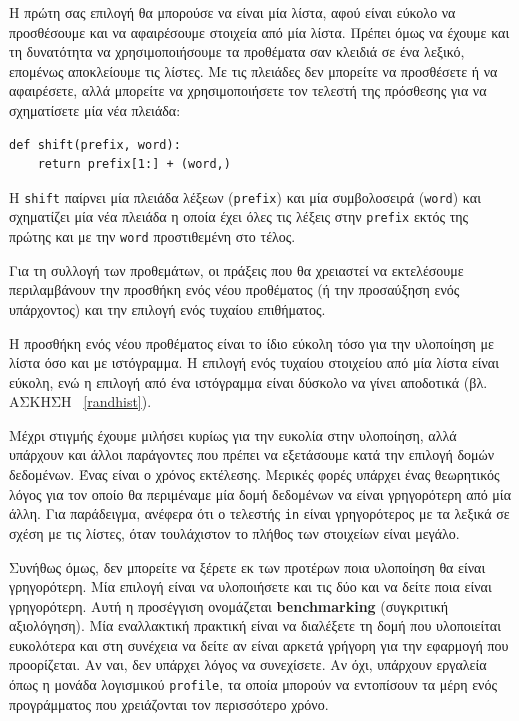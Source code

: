 \documentclass[10pt]{book}
\begin{document}
Η πρώτη σας επιλογή θα μπορούσε να είναι μία λίστα, αφού είναι εύκολο να προσθέσουμε και να αφαιρέσουμε στοιχεία από μία λίστα. Πρέπει όμως να έχουμε και τη δυνατότητα να χρησιμοποιήσουμε τα προθέματα σαν κλειδιά σε ένα λεξικό, επομένως αποκλείουμε τις λίστες. Με τις πλειάδες δεν μπορείτε να προσθέσετε ή να αφαιρέσετε, αλλά μπορείτε να χρησιμοποιήσετε τον τελεστή της πρόσθεσης για να σχηματίσετε μία νέα πλειάδα:

\begin{verbatim}
def shift(prefix, word):
    return prefix[1:] + (word,)
\end{verbatim}
%
Η {\tt shift} παίρνει μία πλειάδα λέξεων ({\tt prefix}) και μία συμβολοσειρά ({\tt word}) και σχηματίζει μία νέα πλειάδα η οποία έχει όλες τις λέξεις στην {\tt prefix} εκτός της πρώτης και με την {\tt word} προστιθεμένη στο τέλος.

Για τη συλλογή των προθεμάτων, οι πράξεις που θα χρειαστεί να εκτελέσουμε περιλαμβάνουν την προσθήκη ενός νέου προθέματος (ή την προσαύξηση ενός υπάρχοντος) και την επιλογή ενός τυχαίου επιθήματος.

Η προσθήκη ενός νέου προθέματος είναι το ίδιο εύκολη τόσο για την υλοποίηση με λίστα όσο και με ιστόγραμμα. 
Η επιλογή ενός τυχαίου στοιχείου από μία λίστα είναι εύκολη, ενώ η επιλογή από ένα ιστόγραμμα είναι δύσκολο να 
γίνει αποδοτικά (βλ. ΑΣΚΗΣΗ ~\ref{randhist}).

Μέχρι στιγμής έχουμε μιλήσει κυρίως για την ευκολία στην υλοποίηση, αλλά υπάρχουν και άλλοι παράγοντες που πρέπει 
να εξετάσουμε κατά την επιλογή δομών δεδομένων. Ένας είναι ο χρόνος εκτέλεσης. Μερικές φορές υπάρχει ένας θεωρητικός λόγος για τον οποίο θα περιμέναμε μία δομή δεδομένων να είναι γρηγορότερη από μία άλλη. Για παράδειγμα, ανέφερα ότι ο τελεστής {\tt in} είναι γρηγορότερος με τα λεξικά σε σχέση με τις λίστες, όταν τουλάχιστον το πλήθος των στοιχείων είναι μεγάλο.

Συνήθως όμως, δεν μπορείτε να ξέρετε εκ των προτέρων ποια υλοποίηση θα είναι γρηγορότερη. Μία επιλογή είναι να υλοποιήσετε και τις δύο και να δείτε ποια είναι γρηγορότερη. Αυτή η προσέγγιση ονομάζεται {\bf benchmarking} (συγκριτική αξιολόγηση). Μία εναλλακτική πρακτική είναι να διαλέξετε τη δομή που υλοποιείται ευκολότερα και στη συνέχεια να δείτε αν είναι αρκετά γρήγορη για την εφαρμογή που προορίζεται. Αν ναι, δεν υπάρχει λόγος να συνεχίσετε. Αν όχι, υπάρχουν εργαλεία όπως η μονάδα λογισμικού {\tt profile}, τα οποία μπορούν να εντοπίσουν τα μέρη ενός προγράμματος που χρειάζονται τον περισσότερο χρόνο.
\end{document}
